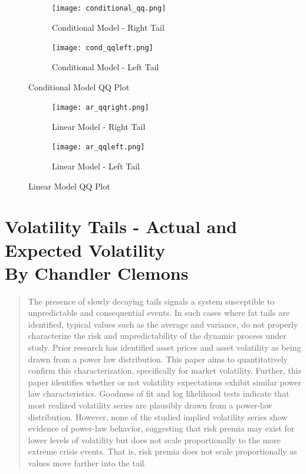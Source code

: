 \documentclass[11pt,a4paper,oldfontcommands]{memoir}
\begin{document}
{\begin{figure}[H]
\centering
\begin{subfigure}{.5\textwidth}
  \centering
  \texttt{[image: conditional\_qq.png]}
  \caption{Conditional Model - Right Tail}
  \label{fig:sub1}
\end{subfigure}%
\begin{subfigure}{.5\textwidth}
  \centering
  \texttt{[image: cond\_qqleft.png]}
  \caption{Conditional Model - Left Tail}
  \label{fig:sub2}
\end{subfigure}
\caption{Conditional Model QQ Plot}
\label{fig:Conditionalqq}
\end{figure}



\begin{figure}[H]
\centering
\begin{subfigure}{.5\textwidth}
  \centering
  \texttt{[image: ar\_qqright.png]}
  \caption{Linear Model - Right Tail}
  \label{fig:sub1}
\end{subfigure}%
\begin{subfigure}{.5\textwidth}
  \centering
  \texttt{[image: ar\_qqleft.png]}
  \caption{Linear Model - Left Tail}
  \label{fig:sub2}
\end{subfigure}
\caption{Linear Model QQ Plot}
\label{fig:Linearqq}
\end{figure}






\chapter{Volatility Tails - Actual and Expected Volatility \\ \small By Chandler Clemons}


\begin{abstract}
The presence of slowly decaying tails signals a system susceptible to unpredictable and consequential events. In such cases where fat tails are identified, typical values such as the average and variance, do not properly characterize the risk and unpredictability of the dynamic process under study. Prior research has identified asset prices and asset volatility as being drawn from a power law distribution. This paper aims to quantitatively confirm this characterization, specifically for market volatility. Further, this paper identifies whether or not volatility expectations exhibit similar power law characteristics. Goodness of fit and log likelihood tests indicate that most realized volatility series are plausibly drawn from a power-law distribution. However, none of the studied implied volatility series show evidence of power-law behavior, suggesting that risk premia may exist for lower levels of volatility but does not scale proportionally to the more extreme crisis events. That is, risk premia does not scale proportionally as values move farther into the tail.


\end{abstract}}
\end{document}
